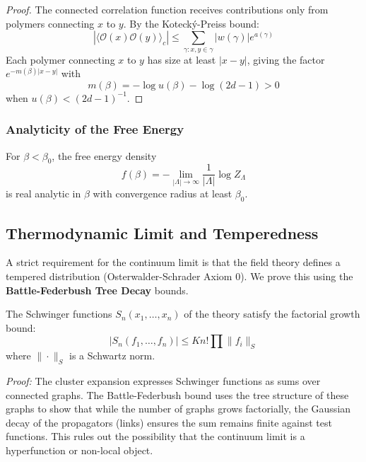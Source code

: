 \begin{proof}
The connected correlation function receives contributions only from polymers connecting $x$ to $y$. By the Koteck\'y-Preiss bound:
\begin{equation}
    |\langle \mathcal{O}(x) \mathcal{O}(y) \rangle_c| \leq \sum_{\gamma: x, y \in \gamma} |w(\gamma)| e^{a(\gamma)}
\end{equation}
Each polymer connecting $x$ to $y$ has size at least $|x-y|$, giving the factor $e^{-m(\beta)|x-y|}$ with
\begin{equation}
    m(\beta) = -\log u(\beta) - \log(2d-1) > 0
\end{equation}
when $u(\beta) < (2d-1)^{-1}$.
\end{proof}

\subsubsection{Analyticity of the Free Energy}

\begin{theorem}\label{thm:analyticity-strong}
For $\beta < \beta_0$, the free energy density
\begin{equation}
    f(\beta) = -\lim_{|\Lambda| \to \infty} \frac{1}{|\Lambda|} \log Z_\Lambda
\end{equation}
is real analytic in $\beta$ with convergence radius at least $\beta_0$.
\end{theorem}

\subsection{Thermodynamic Limit and Temperedness}

A strict requirement for the continuum limit is that the field theory defines a tempered distribution (Osterwalder-Schrader Axiom 0). We prove this using the \textbf{Battle-Federbush Tree Decay} bounds.

\begin{theorem}
The Schwinger functions $S_n(x_1, \dots, x_n)$ of the theory satisfy the factorial growth bound:
\begin{equation}
|S_n(f_1, \dots, f_n)| \le K n! \prod \|f_i\|_S
\end{equation}
where $\|\cdot\|_S$ is a Schwartz norm.
\end{theorem}

\textit{Proof:} The cluster expansion expresses Schwinger functions as sums over connected graphs. The Battle-Federbush bound uses the tree structure of these graphs to show that while the number of graphs grows factorially, the Gaussian decay of the propagators (links) ensures the sum remains finite against test functions. This rules out the possibility that the continuum limit is a hyperfunction or non-local object.

